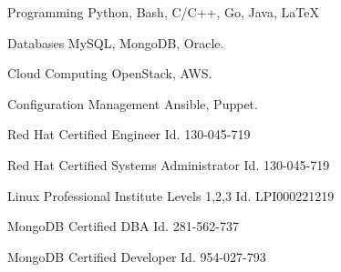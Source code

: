

\begin{cvskills}

  \cvskill
    {Programming} %
    {Python, Bash, C/C++, Go, Java, LaTeX} %

  \cvskill
    {Databases} %
    {MySQL, MongoDB, Oracle.} %

  \cvskill
    {Cloud Computing} %
    {OpenStack, AWS.} %

  \cvskill
    {Configuration Management} %
    {Ansible, Puppet.} %

  \cvskill
    {Red Hat Certified Engineer} %
    {Id. 130-045-719} %

  \cvskill
    {Red Hat Certified Systems Administrator} %
    {Id. 130-045-719} %

  \cvskill
    {Linux Professional Institute Levels 1,2,3} %
    {Id. LPI000221219} %

  \cvskill
    {MongoDB Certified DBA} %
    {Id. 281-562-737} %

  \cvskill
    {MongoDB Certified Developer} %
    {Id. 954-027-793} %

\end{cvskills}
